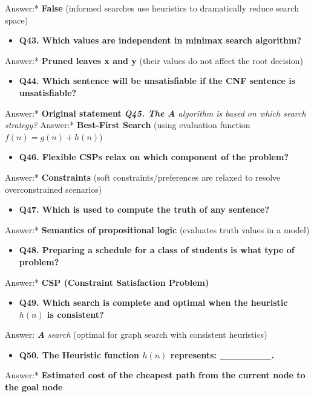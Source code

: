     \textit{   }Answer:* \textbf{False} (informed searches use heuristics to dramatically reduce search space)
\begin{itemize}
  \item   \textbf{Q43. Which values are independent in minimax search algorithm?}
\end{itemize}
    \textit{   }Answer:* \textbf{Pruned leaves x and y} (their values do not affect the root decision)
\begin{itemize}
  \item   \textbf{Q44. Which sentence will be unsatisfiable if the CNF sentence is unsatisfiable?}
\end{itemize}
    \textit{   }Answer:* \textbf{Original statement}
\textit{   \textbf{Q45. The A} algorithm is based on which search strategy?}
    \textit{   }Answer:* \textbf{Best-First Search} (using evaluation function $f(n) = g(n) + h(n)$)
\begin{itemize}
  \item   \textbf{Q46. Flexible CSPs relax on which component of the problem?}
\end{itemize}
    \textit{   }Answer:* \textbf{Constraints} (soft constraints/preferences are relaxed to resolve overconstrained scenarios)
\begin{itemize}
  \item   \textbf{Q47. Which is used to compute the truth of any sentence?}
\end{itemize}
    \textit{   }Answer:* \textbf{Semantics of propositional logic} (evaluates truth values in a model)
\begin{itemize}
  \item   \textbf{Q48. Preparing a schedule for a class of students is what type of problem?}
\end{itemize}
    \textit{   }Answer:* \textbf{CSP (Constraint Satisfaction Problem)}
\begin{itemize}
  \item   \textbf{Q49. Which search is complete and optimal when the heuristic $h(n)$ is consistent?}
\end{itemize}
    \textit{   }Answer:\textit{ \textbf{A} search} (optimal for graph search with consistent heuristics)
\begin{itemize}
  \item   \textbf{Q50. The Heuristic function $h(n)$ represents: \_\_\_\_\_\_\_.}
\end{itemize}
    \textit{   }Answer:* \textbf{Estimated cost of the cheapest path from the current node to the goal node}
